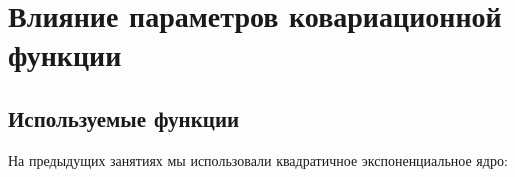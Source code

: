 \documentclass[11pt,a4paper]{article}
\begin{document}
%
%
%
%

    \hypertarget{ux432ux43bux438ux44fux43dux438ux435-ux43fux430ux440ux430ux43cux435ux442ux440ux43eux432-ux43aux43eux432ux430ux440ux438ux430ux446ux438ux43eux43dux43dux43eux439-ux444ux443ux43dux43aux446ux438ux438}{%
\section{Влияние параметров ковариационной
функции}\label{ux432ux43bux438ux44fux43dux438ux435-ux43fux430ux440ux430ux43cux435ux442ux440ux43eux432-ux43aux43eux432ux430ux440ux438ux430ux446ux438ux43eux43dux43dux43eux439-ux444ux443ux43dux43aux446ux438ux438}}

    \hypertarget{ux438ux441ux43fux43eux43bux44cux437ux443ux435ux43cux44bux435-ux444ux443ux43dux43aux446ux438ux438}{%
\subsection{Используемые
функции}\label{ux438ux441ux43fux43eux43bux44cux437ux443ux435ux43cux44bux435-ux444ux443ux43dux43aux446ux438ux438}}

На предыдущих занятиях мы использовали квадратичное экспоненциальное
ядро:
\end{document}
